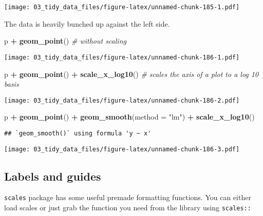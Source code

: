 \documentclass[
]{book}
\newenvironment{Shaded}{\begin{snugshade}}{\end{snugshade}}
\newcommand{\CommentTok}[1]{\textcolor[rgb]{0.56,0.35,0.01}{\textit{#1}}}
\newcommand{\DataTypeTok}[1]{\textcolor[rgb]{0.13,0.29,0.53}{#1}}
\newcommand{\KeywordTok}[1]{\textcolor[rgb]{0.13,0.29,0.53}{\textbf{#1}}}
\newcommand{\NormalTok}[1]{#1}
\newcommand{\OperatorTok}[1]{\textcolor[rgb]{0.81,0.36,0.00}{\textbf{#1}}}
\newcommand{\StringTok}[1]{\textcolor[rgb]{0.31,0.60,0.02}{#1}}
\begin{document}
\texttt{[image: 03\_tidy\_data\_files/figure-latex/unnamed-chunk-185-1.pdf]}

The data is heavily bunched up against the left side.

\begin{Shaded}
\begin{Highlighting}[]
\NormalTok{p }\OperatorTok{+}\StringTok{ }\KeywordTok{geom\_point}\NormalTok{() }\CommentTok{\# without scaling}
\end{Highlighting}
\end{Shaded}

\texttt{[image: 03\_tidy\_data\_files/figure-latex/unnamed-chunk-186-1.pdf]}

\begin{Shaded}
\begin{Highlighting}[]
\NormalTok{p }\OperatorTok{+}\StringTok{ }\KeywordTok{geom\_point}\NormalTok{() }\OperatorTok{+}
\StringTok{  }\KeywordTok{scale\_x\_log10}\NormalTok{() }\CommentTok{\# scales the axis of a plot to a log 10 basis}
\end{Highlighting}
\end{Shaded}

\texttt{[image: 03\_tidy\_data\_files/figure-latex/unnamed-chunk-186-2.pdf]}

\begin{Shaded}
\begin{Highlighting}[]
\NormalTok{p }\OperatorTok{+}\StringTok{ }\KeywordTok{geom\_point}\NormalTok{() }\OperatorTok{+}
\StringTok{  }\KeywordTok{geom\_smooth}\NormalTok{(}\DataTypeTok{method =} \StringTok{"lm"}\NormalTok{) }\OperatorTok{+}
\StringTok{  }\KeywordTok{scale\_x\_log10}\NormalTok{()}
\end{Highlighting}
\end{Shaded}

\begin{verbatim}
## `geom_smooth()` using formula 'y ~ x'
\end{verbatim}

\texttt{[image: 03\_tidy\_data\_files/figure-latex/unnamed-chunk-186-3.pdf]}

\hypertarget{labels-and-guides}{%
\subsection{Labels and guides}\label{labels-and-guides}}

\texttt{scales} package has some useful premade formatting functions. You can either load scales or just grab the function you need from the library using \texttt{scales::}
\end{document}
